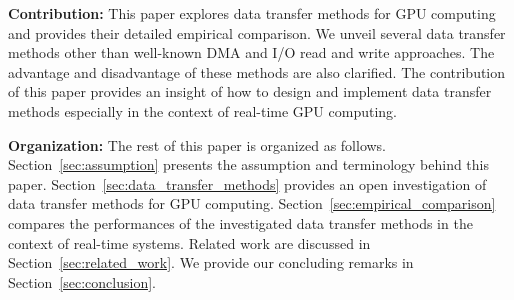 \textbf{Contribution:}
This paper explores data transfer methods for GPU computing and
provides their detailed empirical comparison.
We unveil several data transfer methods other than well-known DMA and
I/O read and write approaches.
The advantage and disadvantage of these methods are also clarified.
The contribution of this paper provides an insight of how to design and
implement data transfer methods especially in the context of real-time
GPU computing.

\textbf{Organization:}
The rest of this paper is organized as follows.
Section~\ref{sec:assumption} presents the assumption and terminology
behind this paper.
Section~\ref{sec:data_transfer_methods} provides an open investigation
of data transfer methods for GPU computing.
Section~\ref{sec:empirical_comparison} compares the performances of the
investigated data transfer methods in the context of real-time systems.
Related work are discussed in Section~\ref{sec:related_work}.
We provide our concluding remarks in Section~\ref{sec:conclusion}.
